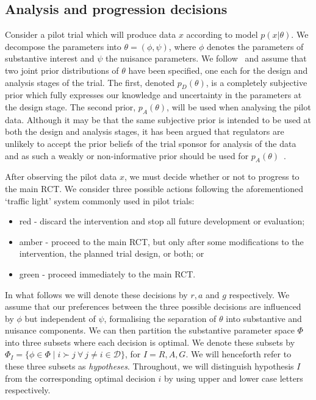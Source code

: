 \documentclass[AMA,STIX1COL]{WileyNJD-v2}
\begin{document}
\subsection{Analysis and progression decisions}\label{sec:analysis}

Consider a pilot trial which will produce data $x$ according to model $p(x | \theta)$. We decompose the parameters into $\theta = (\phi, \psi)$, where $\phi$ denotes the parameters of substantive interest and $\psi$ the nuisance parameters. We follow~\cite{Wang2002} and assume that two joint prior distributions of $\theta$ have been specified, one each for the design and analysis stages of the trial. The first, denoted $p_{D}(\theta)$, is a completely subjective prior which fully expresses our knowledge and uncertainty in the parameters at the design stage. The second prior, $p_A(\theta)$, will be used when analysing the pilot data. Although it may be that the same subjective prior is intended to be used at both the design and analysis stages, it has been argued that regulators are unlikely to accept the prior beliefs of the trial sponsor for analysis of the data and as such a weakly or non-informative prior should be used for $p_A(\theta)$~\cite{OHagan2005, Walley2015}.

After observing the pilot data $x$, we must decide whether or not to progress to the main RCT. We consider three possible actions following the aforementioned `traffic light' system commonly used in pilot trials: 
\begin{itemize}
\item red - discard the intervention and stop all future development or evaluation; 
\item amber - proceed to the main RCT, but only after some modifications to the intervention, the planned trial design, or both; or
\item green - proceed immediately to the main RCT.
\end{itemize}
 
In what follows we will denote these decisions by $r, a$ and $g$ respectively. We assume that our preferences between the three possible decisions are influenced by $\phi$ but independent of $\psi$, formalising the separation of $\theta$ into substantive and nuisance components. We can then partition the substantive parameter space $\Phi$ into three subsets where each decision is optimal. We denote these subsets by $\Phi_{I} = \{ \phi \in \Phi \mid i \succ j ~\forall ~j \neq i \in \mathcal{D} \}$, for $I = R, A, G$. We will henceforth refer to these three subsets as \emph{hypotheses}. Throughout, we will distinguish hypothesis $I$ from the corresponding optimal decision $i$ by using upper and lower case letters respectively.
\end{document}
